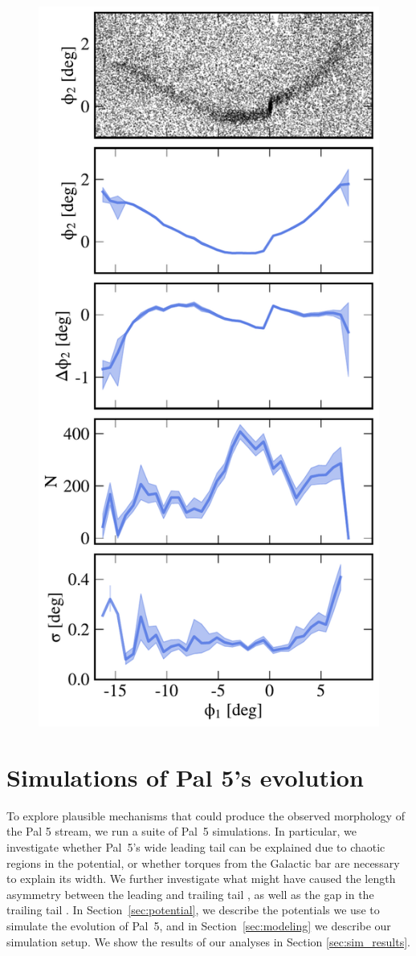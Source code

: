 \documentclass[twocolumn]{aastex62}
\begin{document}
\begin{figure}
\begin{center}
\includegraphics[width=0.8\columnwidth]{observed_profiles.pdf}
\end{center}
\caption{
}
\label{fig:adrian}
\end{figure}


\section{Simulations of Pal 5's evolution}
\label{sec:sim}
To explore plausible mechanisms that could produce the observed morphology of the Pal 5 stream, we run a suite of Pal~5 simulations.
In particular, we investigate whether Pal~5's wide leading tail can be explained due to chaotic regions in the potential, or whether torques from the Galactic bar are necessary to explain its width. We further investigate what might have caused the length asymmetry between the leading and trailing tail , as well as the gap in the trailing tail .
In Section~\ref{sec:potential}, we describe the potentials we use to simulate the evolution of Pal~5, and in Section~\ref{sec:modeling} we describe our simulation setup.
We show the results of our analyses in Section \ref{sec:sim_results}.
\end{document}
